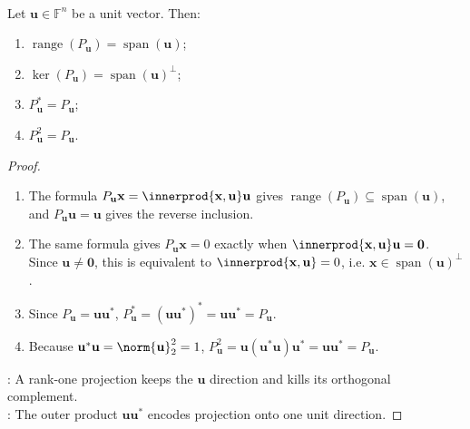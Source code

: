\begin{proposition} \label{prop:rank-one-projection-matrix-properties} \\
Let $\mathbf{u}\in\mathbb{F}^n$ be a unit vector. Then:
\begin{enumerate}[label=\roman*.]
\setlength{\itemsep}{0pt}
\item $\operatorname{range}(P_{\mathbf{u}})=\operatorname{span}(\mathbf{u})$;
\item $\ker(P_{\mathbf{u}})=\operatorname{span}(\mathbf{u})^{\perp}$;
\item $P_{\mathbf{u}}^*=P_{\mathbf{u}}$;
\item $P_{\mathbf{u}}^2=P_{\mathbf{u}}$.
\end{enumerate}
\begin{proof}
\begin{enumerate}[label=(\roman*)]
\setlength{\itemsep}{0pt}
\item The formula $P_{\mathbf{u}}\mathbf{x}=\innerprod{\mathbf{x},\mathbf{u}}\mathbf{u}$ gives $\operatorname{range}(P_{\mathbf{u}})\subseteq\operatorname{span}(\mathbf{u})$, and $P_{\mathbf{u}}\mathbf{u}=\mathbf{u}$ gives the reverse inclusion.
\item The same formula gives $P_{\mathbf{u}}\mathbf{x}=0$ exactly when $\innerprod{\mathbf{x},\mathbf{u}}\mathbf{u}=\mathbf{0}$.\\
Since $\mathbf{u}\neq\mathbf{0}$, this is equivalent to $\innerprod{\mathbf{x},\mathbf{u}}=0$, i.e. $\mathbf{x}\in\operatorname{span}(\mathbf{u})^{\perp}$.
\item Since $P_{\mathbf{u}}=\mathbf{u}\mathbf{u}^*$, $P_{\mathbf{u}}^*=(\mathbf{u}\mathbf{u}^*)^*=\mathbf{u}\mathbf{u}^*=P_{\mathbf{u}}$.
\item Because $\mathbf{u}^*\mathbf{u}=\norm{\mathbf{u}}_2^2=1$, $P_{\mathbf{u}}^2=\mathbf{u}(\mathbf{u}^*\mathbf{u})\mathbf{u}^*=\mathbf{u}\mathbf{u}^*=P_{\mathbf{u}}$.
\end{enumerate}
: A rank-one projection keeps the $\mathbf{u}$ direction and kills its orthogonal complement.\\
: The outer product $\mathbf{u}\mathbf{u}^*$ encodes projection onto one unit direction.
\end{proof}
\end{proposition}

